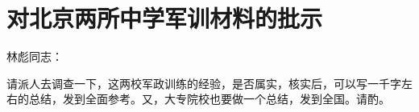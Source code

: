 \section[对北京两所中学军训材料的批示（一九六七年二月）]{对北京两所中学军训材料的批示}


林彪同志：

请派人去调查一下，这两校军政训练的经验，是否属实，核实后，可以写一千字左右的总结，发到全面参考。又，大专院校也要做一个总结，发到全国。请酌。

